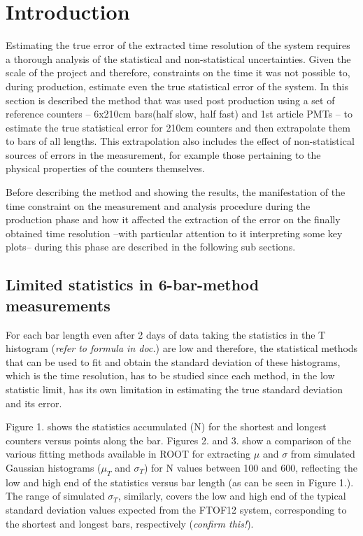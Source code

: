 \documentclass[12pt]{article}
\begin{document}
\maketitle


 
\section{Introduction}

Estimating the true error of the extracted time resolution of the system requires a thorough analysis of the statistical and non-statistical uncertainties. Given the scale of the project and therefore, constraints on the time it was not possible to, during production, estimate even the true statistical error of the system. In this section is described the method that was used post production using a set of reference counters -- 6x210cm bars(half slow, half fast) and 1st article PMTs -- to estimate the true statistical error for 210cm counters and then extrapolate them to bars of all lengths. This extrapolation also includes the effect of non-statistical sources of errors in the measurement, for example those pertaining to the physical properties of the counters themselves. 

Before describing the method and showing the results, the manifestation of the time constraint on the measurement and analysis procedure during the production phase and how it affected the extraction of the error on the finally obtained time resolution --with particular attention to it interpreting some key plots-- during this phase are described in the following sub sections.

\subsection{Limited statistics in 6-bar-method measurements}
For each bar length even after 2 days of data taking the statistics in the T histogram (\textit{refer to formula in doc.}) are low and therefore, the statistical methods that can be used to fit and obtain the standard deviation of these histograms, which is the time resolution, has to be studied since each method, in the low statistic limit, has its own limitation in estimating the true standard deviation and its error. 

Figure 1. shows the statistics accumulated (N) for the shortest and longest counters versus points along the bar. Figures 2. and 3. show a comparison of the various fitting methods available in ROOT for extracting $\mu$ and $\sigma$ from simulated Gaussian histograms ($\mu_{T}$ and $\sigma_{T}$) for N values between 100 and 600, reflecting the low and high end of the statistics versus bar length (as can be seen in Figure 1.). The range of simulated $\sigma_{T}$, similarly, covers the low and high end of the typical standard deviation values expected from the FTOF12 system, corresponding to the shortest and longest bars, respectively (\textit{confirm this!}).
\end{document}
